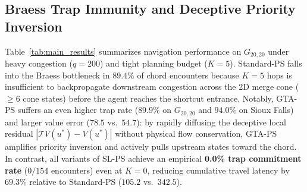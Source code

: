 \documentclass[11pt,a4paper]{article}
\begin{document}
\begin{table}[t]
\centering
\caption{Performance comparison on $G_{20,20}$ ($q = 200$, backup budget $K = 5$) across 50 Monte Carlo episodes. SL-PS achieves 0\% trap commitment and near-oracle travel latency with sub-millisecond to millisecond online overhead.}
\label{tab:main_results}
\vspace{0.15cm}
\end{table}

\subsection{Braess Trap Immunity and Deceptive Priority Inversion}
Table~\ref{tab:main_results} summarizes navigation performance on $G_{20,20}$ under heavy congestion ($q = 200$) and tight planning budget ($K = 5$). Standard-PS falls into the Braess bottleneck in $89.4\%$ of chord encounters because $K=5$ hops is insufficient to backpropagate downstream congestion across the 2D merge cone ($\ge 6$ cone states) before the agent reaches the shortcut entrance. Notably, GTA-PS suffers an even higher trap rate ($89.9\%$ on $G_{20,20}$ and $94.0\%$ on Sioux Falls) and larger value error ($78.5$ vs.\ $54.7$): by rapidly diffusing the deceptive local residual $|\mathcal{T}V(u^*) - V(u^*)|$ without physical flow conservation, GTA-PS amplifies priority inversion and actively pulls upstream states toward the chord. In contrast, all variants of SL-PS achieve an empirical \textbf{0.0\% trap commitment rate} ($0/154$ encounters) even at $K = 0$, reducing cumulative travel latency by $69.3\%$ relative to Standard-PS ($105.2$ vs.\ $342.5$).
\end{document}
